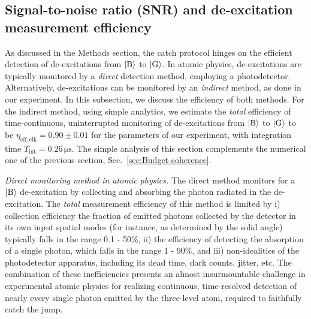 \documentclass[
						superscriptaddress, 																 amsmath, amssymb,
		 aps,  prb,  
										floatfix,
		linenumbers,
			]{revtex4-1}
\begin{document}
\subsection{Signal-to-noise ratio (SNR) and de-excitation measurement efficiency\label{subsec:Signal-to-noise-ratio-(SNR)}}

As discussed in the Methods section, the catch protocol hinges on
the efficient detection of de-excitations from $|{\rm B}\rangle$
to $|{\rm G}\rangle$. In atomic physics, de-excitations are typically
monitored by a \emph{direct} detection method, employing a photodetector.
Alternatively, de-excitations can be monitored by an\emph{ indirect}
method, as done in our experiment. In this subsection, we discuss
the efficiency of both methods. For the indirect method, using simple
analytics, we estimate the \emph{total} efficiency of time-continuous,
uninterrupted monitoring of de-excitations from $|{\rm B}\rangle$
to $|{\rm G}\rangle$ to be $\eta_{\mathrm{eff,clk}}=0.90\pm0.01$
for the parameters of our experiment, with integration time $T_{\mathrm{int}}=0.26\,\mathrm{\mu s}$.
The simple analysis of this section complements the numerical one
of the previous section, Sec.~\ref{sec:Budget-coherence}.

\emph{Direct monitoring method in atomic physics.} The direct method
monitors for a $|{\rm B}\rangle$ de-excitation by collecting and
absorbing the photon radiated in the de-excitation. The \emph{total}
measurement efficiency of this method is limited by i) collection
efficiency \textemdash{} the fraction of emitted photons collected
by the detector in its own input spatial modes (for instance, as determined
by the solid angle) \textemdash{} typically falls in the range 0.1
- 50\%,\cite{Volz2011} ii) the efficiency of detecting the absorption
of a single photon, which falls in the range 1 - 90\%,\cite{Eisaman2011}
and iii) non-idealities of the photodetector apparatus, including
its dead time, dark counts, jitter, etc.\cite{Eisaman2011} The combination
of these inefficiencies presents an almost insurmountable challenge
in experimental atomic physics for realizing continuous, time-resolved
detection of nearly every single photon emitted by the three-level
atom, required to faithfully catch the jump. 
\end{document}
